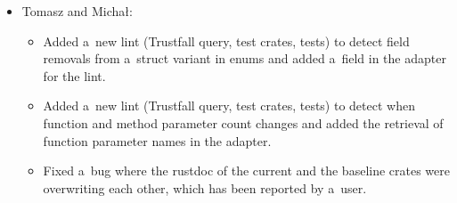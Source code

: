 \documentclass[licencjacka,en]{pracamgr}
\begin{document}
\begin{itemize}
\begin{itemize}
		\end{itemize}

	\item Tomasz and Michał:
		\begin{itemize}
			\item Added a~new lint (Trustfall query, test crates, tests) to detect field removals
				from a~struct variant in enums and added a~field in the adapter for the lint.
			\item Added a~new lint (Trustfall query, test crates, tests) to detect when function
				and method parameter count changes and added the retrieval of function parameter
				names in the adapter.
			\item Fixed a~bug where the rustdoc of the current and the baseline crates
				were overwriting each other, which has been reported by a~user.
		\end{itemize}


\end{itemize}
\end{document}
